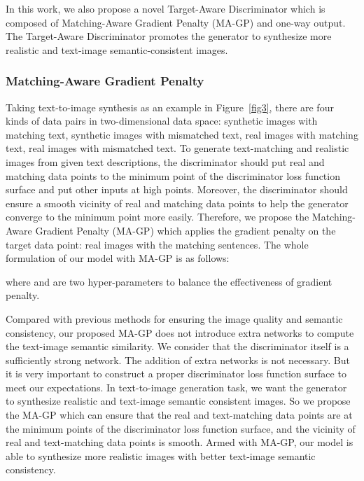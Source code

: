 \documentclass[10pt,twocolumn,letterpaper]{article}
\begin{document}
In this work, we also propose a novel Target-Aware Discriminator which is composed of Matching-Aware Gradient Penalty (MA-GP) and one-way output.
The Target-Aware Discriminator promotes the generator to synthesize more realistic and text-image semantic-consistent images. 




\subsubsection{Matching-Aware Gradient Penalty}

Taking text-to-image synthesis as an example in Figure~\ref{fig3}, there are four kinds of data pairs in two-dimensional data space: synthetic images with matching text, synthetic images with mismatched text, real images with matching text, real images with mismatched text. 
To generate text-matching and realistic images from given text descriptions, the discriminator should put real and matching data points to the minimum point of the discriminator loss function surface and put other inputs at high points.
Moreover, the discriminator should ensure a smooth vicinity of real and matching data points to help the generator converge to the minimum point more easily.
Therefore, we propose the Matching-Aware Gradient Penalty (MA-GP) which applies the gradient penalty on the target data point: real images with the matching sentences. 
The whole formulation of our model with MA-GP is as follows:


where  and  are two hyper-parameters to balance the effectiveness of gradient penalty.

Compared with previous methods for ensuring the image quality and semantic consistency, our proposed MA-GP does not introduce extra networks to compute the text-image semantic similarity.
We consider that the discriminator itself is a sufficiently strong network. 
The addition of extra networks is not necessary. 
But it is very important to construct a proper discriminator loss function surface to meet our expectations. 
In text-to-image generation task, we want the generator to synthesize realistic and text-image semantic consistent images.
So we propose the MA-GP which can ensure that the real and text-matching data points are at the minimum points of the discriminator loss function surface, and the vicinity of real and text-matching data points is smooth.
Armed with MA-GP, our model is able to synthesize more realistic images with better text-image semantic consistency.
\end{document}
